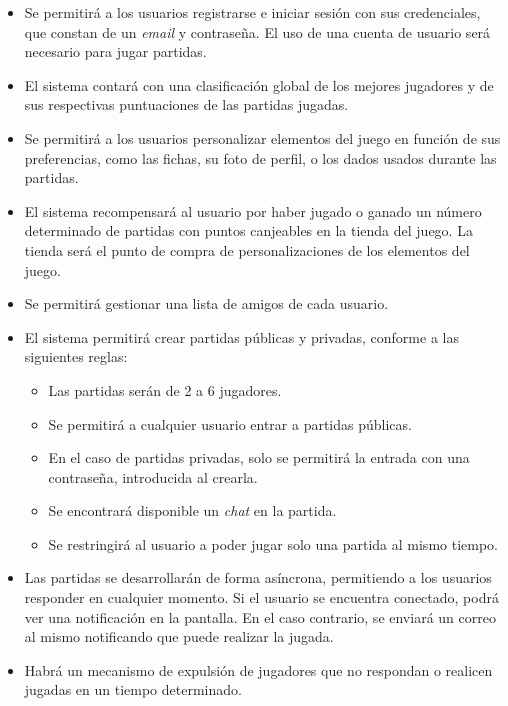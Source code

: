 \documentclass[11pt, a4paper, titlepage]{article}
\begin{document}
\begin{itemize}
\item Se permitirá a los usuarios registrarse e iniciar sesión con sus credenciales, que constan de un \textit{email} y contraseña. El uso de una cuenta de usuario será necesario para jugar partidas.

\item El sistema contará con una clasificación global de los mejores jugadores y de sus respectivas puntuaciones de las partidas jugadas.

\item Se permitirá a los usuarios personalizar elementos del juego en función de sus preferencias, como las fichas, su foto de perfil, o los dados usados durante las partidas.

\item El sistema recompensará al usuario por haber jugado o ganado un número determinado de partidas con puntos canjeables en la tienda del juego. La tienda será el punto de compra de personalizaciones de los elementos del juego.

\item Se permitirá gestionar una lista de amigos de cada usuario.

\item El sistema permitirá crear partidas públicas y privadas, conforme a las siguientes reglas:
\begin{itemize}
    \item Las partidas serán de 2 a 6 jugadores.
    \item Se permitirá a cualquier usuario entrar a partidas públicas.
    \item En el caso de partidas privadas, solo se permitirá la entrada con una contraseña, introducida al crearla.
    \item Se encontrará disponible un \textit{chat} en la partida.
    \item Se restringirá al usuario a poder jugar solo una partida al mismo tiempo.
\end{itemize}

\item Las partidas se desarrollarán de forma asíncrona, permitiendo a los usuarios responder en cualquier momento. Si el usuario se encuentra conectado, podrá ver una notificación en la pantalla. En el caso contrario, se enviará un correo al mismo notificando que puede realizar la jugada.

\item Habrá un mecanismo de expulsión de jugadores que no respondan o realicen jugadas en un tiempo determinado.

\end{itemize}
\end{document}
